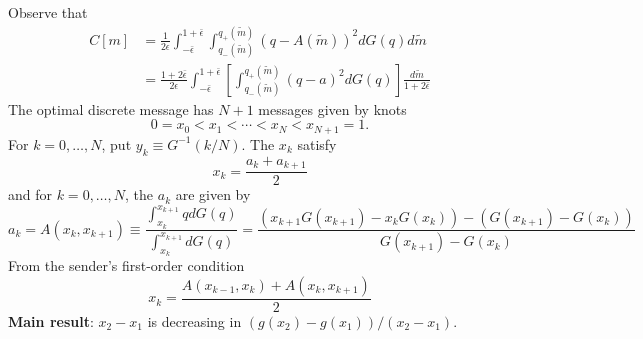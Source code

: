 \documentclass[12pt]{article}
\begin{document}
\onehalfspacing
\noindent Observe that
\begin{align}
C[m]&=\frac{1}{2\epsilon}\int_{-\bar{\epsilon}}^{1+\bar{\epsilon}}{\int_{q_{-}(\tilde{m})}^{q_{+}(\tilde{m})}{(q-A(\tilde{m}))^{2}dG(q)}d\tilde{m}}\\
&=\frac{1+2\bar{\epsilon}}{2\epsilon}\int_{-\bar{\epsilon}}^{1+\bar{\epsilon}}{\left[\int_{q_{-}(\tilde{m})}^{q_{+}(\tilde{m})}{(q-a)^{2}dG(q)}\right]\frac{d\tilde{m}}{1+2\bar{\epsilon}}}
\end{align}
The optimal discrete message has $N+1$ messages given by knots
\begin{equation}
0=x_{0}<x_{1}<\cdots<x_{N}<x_{N+1}=1. 
\end{equation}
For $k=0,\ldots,N$, put $y_{k}\equiv G^{-1}(k/N)$. The $x_{k}$ satisfy
\begin{equation}
x_{k}=\frac{a_{k}+a_{k+1}}{2}
\end{equation}
and for $k=0,\ldots,N$, the $a_{k}$ are given by
\begin{equation}
a_{k}=A(x_{k},x_{k+1})\equiv\frac{\int_{x_{k}}^{x_{k+1}}{qdG(q)}}{\int_{x_{k}}^{x_{k+1}}{dG(q)}}=\frac{(x_{k+1}G(x_{k+1})-x_{k}G(x_{k}))-(G(x_{k+1})-G(x_{k}))}{G(x_{k+1})-G(x_{k})}
\end{equation}
From the sender's first-order condition
\begin{equation}
x_{k}=\frac{A(x_{k-1},x_{k})+A(x_{k},x_{k+1})}{2}
\end{equation}
\textbf{Main result}: $x_{2}-x_{1}$ is decreasing in $(g(x_{2})-g(x_{1}))/(x_{2}-x_{1})$. 
\end{document}
